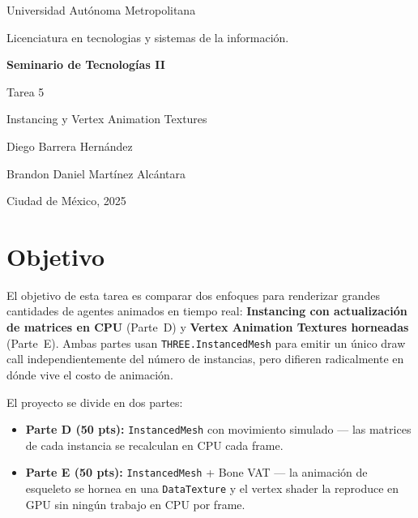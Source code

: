 \documentclass[12pt,a4paper]{article}
\begin{document}
\begin{titlepage}
  \centering
  \vspace*{1.5cm}

  {\Large Universidad Autónoma Metropolitana\par}
  \vspace{0.4cm}
  {\large Licenciatura en tecnologias y sistemas de la información.\par}

  \vspace{2.5cm}
  {\Huge\bfseries Seminario de Tecnologías II\par}
  \vspace{0.6cm}
  {\LARGE Tarea 5\par}
  \vspace{0.4cm}
  {\large Instancing y Vertex Animation Textures\par}

  \vspace{3cm}
  {\large Diego Barrera Hernández\par}
  \vspace{0.3cm}
  {\large Brandon Daniel Martínez Alcántara\par}

  \vfill
  {\large Ciudad de México, 2025\par}
\end{titlepage}

\tableofcontents
\newpage

\section{Objetivo}

El objetivo de esta tarea es comparar dos enfoques para renderizar grandes cantidades de
agentes animados en tiempo real: \textbf{Instancing con actualización de matrices en CPU}
(Parte~D) y \textbf{Vertex Animation Textures horneadas} (Parte~E). Ambas partes usan
\texttt{THREE.InstancedMesh} para emitir un único draw call independientemente del número
de instancias, pero difieren radicalmente en dónde vive el costo de animación.

El proyecto se divide en dos partes:

\begin{itemize}[leftmargin=*]
  \item \textbf{Parte D (50 pts):} \texttt{InstancedMesh} con movimiento simulado —
        las matrices de cada instancia se recalculan en CPU cada frame.
  \item \textbf{Parte E (50 pts):} \texttt{InstancedMesh} + Bone VAT —
        la animación de esqueleto se hornea en una \texttt{DataTexture} y el
        vertex shader la reproduce en GPU sin ningún trabajo en CPU por frame.
\end{itemize}
\end{document}
